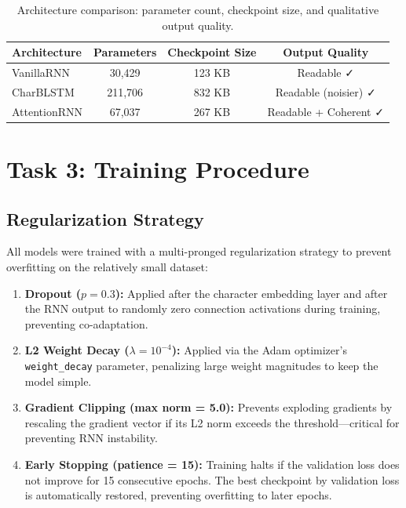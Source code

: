 \documentclass[11pt,a4paper]{article}
\begin{document}
\begin{table}[H]
    \centering
    \renewcommand{\arraystretch}{1.3}
    \begin{tabular}{@{} l c c c @{}}
        \toprule
        \textbf{\color{iitjblue} Architecture} & \textbf{\color{iitjblue} Parameters} & \textbf{\color{iitjblue} Checkpoint Size} & \textbf{\color{iitjblue} Output Quality} \\
        \midrule
        VanillaRNN & 30,429 & 123 KB & Readable ✓ \\
        \rowcolor{highlightbg}
        CharBLSTM  & 211,706 & 832 KB & Readable (noisier) ✓ \\
        AttentionRNN & 67,037 & 267 KB & Readable + Coherent ✓ \\
        \bottomrule
    \end{tabular}
    \vspace{0.5em}
    \caption{Architecture comparison: parameter count, checkpoint size, and qualitative output quality.}
\end{table}

\section{Task 3: Training Procedure}

\subsection{Regularization Strategy}
All models were trained with a multi-pronged regularization strategy to prevent overfitting on the relatively small dataset:

\begin{enumerate}[label=\textbf{\textcolor{iitjblue}{\arabic*.}}, itemsep=0.5em]
    \justifying
    \item \textbf{Dropout ($p=0.3$):} Applied after the character embedding layer and after the RNN output to randomly zero connection activations during training, preventing co-adaptation.
    \item \textbf{L2 Weight Decay ($\lambda = 10^{-4}$):} Applied via the Adam optimizer's \texttt{weight\_decay} parameter, penalizing large weight magnitudes to keep the model simple.
    \item \textbf{Gradient Clipping (max norm = 5.0):} Prevents exploding gradients by rescaling the gradient vector if its L2 norm exceeds the threshold—critical for preventing RNN instability.
    \item \textbf{Early Stopping (patience = 15):} Training halts if the validation loss does not improve for 15 consecutive epochs. The best checkpoint by validation loss is automatically restored, preventing overfitting to later epochs.
\end{enumerate}
\end{document}
